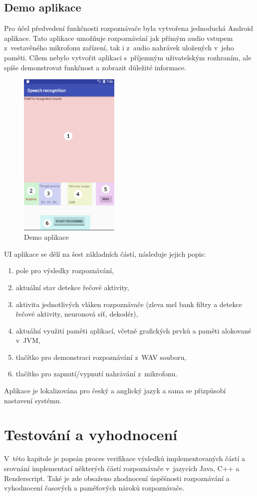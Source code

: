 \section{Demo aplikace}
Pro účel předvedení funkčnosti rozpoznávače byla vytvořena jednoduchá Android aplikace. Tato aplikace umožňuje rozpoznávání jak přímým audio vstupem z~vestavěného mikrofonu zařízení, tak i z~audio nahrávek uložených v~jeho paměti. Cílem nebylo vytvořit aplikaci s~příjemným uživatelským rozhraním, ale spíše demonstrovat funkčnost a zobrazit důležité informace.

\begin{figure}[H]
	\centering
		\includegraphics[height=8cm]{obrazky-figures/demo_app.png}
        \caption{Demo aplikace}
\end{figure}

UI aplikace se dělí na šest základních částí, následuje jejich popis:
\begin{enumerate}  
\item pole pro výsledky rozpoznávání,
\item aktuální stav detekce řečové aktivity,
\item aktivita jednotlivých vláken rozpoznávače (zleva mel bank filtry a detekce řečové aktivity, neuronová síť, dekodér),
\item aktuální využití paměti aplikací, včetně grafických prvků a paměti alokované v~JVM,
\item tlačítko pro demonstraci rozpoznávání z~WAV souboru,
\item tlačítko pro zapnutí/vypnutí nahrávání z~mikrofonu.
\end{enumerate}
Aplikace je lokalizována pro český a anglický jazyk a sama se přizpůsobí nastavení systému.

\chapter{Testování a vyhodnocení}
V~této kapitole je popsán proces verifikace výsledků implementovaných částí a srovnání implementací některých částí rozpoznávače v~jazycích Java, C++ a Renderscript. Také je zde obsaženo zhodnocení úspěšnosti rozpoznávání a vyhodnocení časových a paměťových nároků rozpoznávače.

